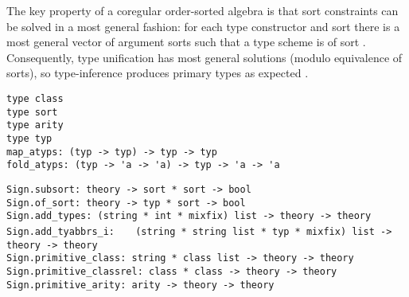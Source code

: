 \begin{isabellebody}
\begin{isamarkuptext}
  The key property of a coregular order-sorted algebra is that sort
  constraints can be solved in a most general fashion: for each type
  constructor \isa{{\isasymkappa}} and sort  there is a most general
  vector of argument sorts  such
  that a type scheme  is of sort .
  Consequently, type unification has most general solutions (modulo
  equivalence of sorts), so type-inference produces primary types as
  expected \cite{nipkow-prehofer}.%
\end{isamarkuptext}%
\isamarkuptrue%
%
\isadelimmlref
%
\endisadelimmlref
%
\isatagmlref
%
\begin{isamarkuptext}%
\begin{mldecls}
  \verb|type class| \\
  \verb|type sort| \\
  \verb|type arity| \\
  \verb|type typ| \\
  \verb|map_atyps: (typ -> typ) -> typ -> typ| \\
  \verb|fold_atyps: (typ -> 'a -> 'a) -> typ -> 'a -> 'a| \\
  \end{mldecls}
  \begin{mldecls}
  \verb|Sign.subsort: theory -> sort * sort -> bool| \\
  \verb|Sign.of_sort: theory -> typ * sort -> bool| \\
  \verb|Sign.add_types: (string * int * mixfix) list -> theory -> theory| \\
  \verb|Sign.add_tyabbrs_i: |\isasep\isanewline%
\verb|  (string * string list * typ * mixfix) list -> theory -> theory| \\
  \verb|Sign.primitive_class: string * class list -> theory -> theory| \\
  \verb|Sign.primitive_classrel: class * class -> theory -> theory| \\
  \verb|Sign.primitive_arity: arity -> theory -> theory| \\
  \end{mldecls}


\end{isamarkuptext}
\end{isabellebody}
